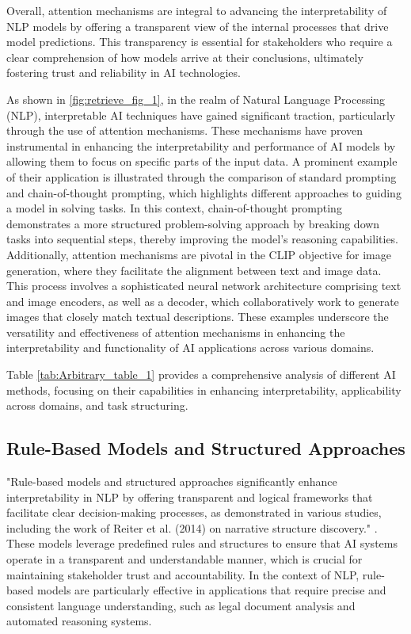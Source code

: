 Overall, attention mechanisms are integral to advancing the interpretability of NLP models by offering a transparent view of the internal processes that drive model predictions. This transparency is essential for stakeholders who require a clear comprehension of how models arrive at their conclusions, ultimately fostering trust and reliability in AI technologies.

As shown in \autoref{fig:retrieve_fig_1}, in the realm of Natural Language Processing (NLP), interpretable AI techniques have gained significant traction, particularly through the use of attention mechanisms. These mechanisms have proven instrumental in enhancing the interpretability and performance of AI models by allowing them to focus on specific parts of the input data. A prominent example of their application is illustrated through the comparison of standard prompting and chain-of-thought prompting, which highlights different approaches to guiding a model in solving tasks. In this context, chain-of-thought prompting demonstrates a more structured problem-solving approach by breaking down tasks into sequential steps, thereby improving the model's reasoning capabilities. Additionally, attention mechanisms are pivotal in the CLIP objective for image generation, where they facilitate the alignment between text and image data. This process involves a sophisticated neural network architecture comprising text and image encoders, as well as a decoder, which collaboratively work to generate images that closely match textual descriptions. These examples underscore the versatility and effectiveness of attention mechanisms in enhancing the interpretability and functionality of AI applications across various domains. \cite{wei2022chain,Hierarchic2}

Table \ref{tab:Arbitrary_table_1} provides a comprehensive analysis of different AI methods, focusing on their capabilities in enhancing interpretability, applicability across domains, and task structuring.

\subsection{Rule-Based Models and Structured Approaches} \label{subsec:Rule-Based Models and Structured Approaches}



"Rule-based models and structured approaches significantly enhance interpretability in NLP by offering transparent and logical frameworks that facilitate clear decision-making processes, as demonstrated in various studies, including the work of Reiter et al. (2014) on narrative structure discovery." \cite{jannidis2016analyzingfeaturesdetectionhappy}. These models leverage predefined rules and structures to ensure that AI systems operate in a transparent and understandable manner, which is crucial for maintaining stakeholder trust and accountability. In the context of NLP, rule-based models are particularly effective in applications that require precise and consistent language understanding, such as legal document analysis and automated reasoning systems.




